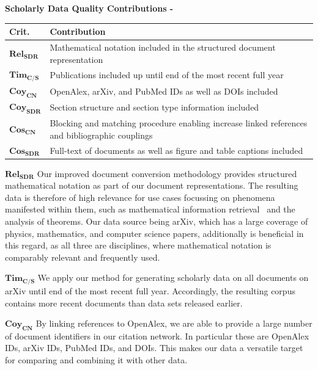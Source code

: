 \begin{infobox-progress}
      \textbf{Scholarly Data Quality Contributions - \cite{Saier2022ULITE,Saier2023unarXive}}\vspace{0.5em}

      \begin{tabular}{lp{10.9cm}}
        \toprule
        Crit. & Contribution \\
        \midrule
        $\mathbf{Rel_{SDR}}$ & Mathematical notation included in the structured document representation \\
        $\mathbf{Tim_{C/S}}$ & Publications included up until end of the most recent full year \\
        $\mathbf{Coy_{CN}}$ & OpenAlex, arXiv, and PubMed IDs as well as DOIs included \\
        $\mathbf{Coy_{SDR}}$ & Section structure and section type information included \\
        $\mathbf{Cos_{CN}}$ & Blocking and matching procedure enabling increase linked references and bibliographic couplings \\
        $\mathbf{Cos_{SDR}}$ & Full-text of documents as well as figure and table captions included \\
        \bottomrule
      \end{tabular}
\end{infobox-progress}

$\mathbf{Rel_{SDR}}$ Our improved document conversion methodology provides structured mathematical notation as part of our document representations. The resulting data is therefore of high relevance for use cases focussing on phenomena manifested within them, such as mathematical information retrieval~\cite{semeval22_task12} and the analysis of theorems. Our data source being arXiv, which has a large coverage of physics, mathematics, and computer science papers, additionally is beneficial in this regard, as all three are disciplines, where mathematical notation is comparably relevant and frequently used.

$\mathbf{Tim_{C/S}}$ We apply our method for generating scholarly data on all documents on arXiv until end of the most recent full year. Accordingly, the resulting corpus contains more recent documents than data sets released earlier.

$\mathbf{Coy_{CN}}$ By linking references to OpenAlex, we are able to provide a large number of document identifiers in our citation network. In particular these are OpenAlex IDs, arXiv IDs, PubMed IDs, and DOIs. This makes our data a versatile target for comparing and combining it with other data.


